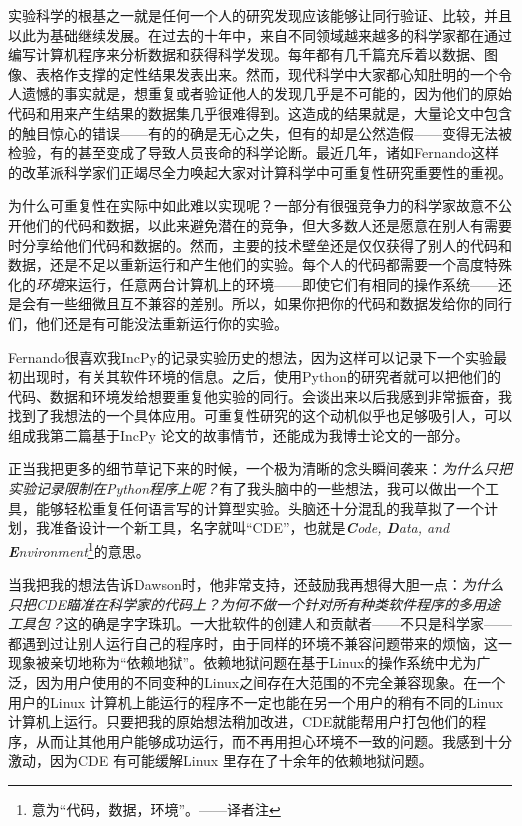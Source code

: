 \documentclass[12pt,UTF8,nofonts]{book}
\begin{document}
实验科学的根基之一就是任何一个人的研究发现应该能够让同行验证、比较，并且以此为基础继续发展。在过去的十年中，来自不同领域越来越多的科学家都在通过编写计算机程序来分析数据和获得科学发现。每年都有几千篇充斥着以数据、图像、表格作支撑的定性结果发表出来。然而，现代科学中大家都心知肚明的一个令人遗憾的事实就是，想重复或者验证他人的发现几乎是不可能的，因为他们的原始代码和用来产生结果的数据集几乎很难得到。这造成的结果就是，大量论文中包含的触目惊心的错误——有的的确是无心之失，但有的却是公然造假——变得无法被检验，有的甚至变成了导致人员丧命的科学论断。最近几年，诸如Fernando这样的改革派科学家们正竭尽全力唤起大家对计算科学中可重复性研究重要性的重视。

为什么可重复性在实际中如此难以实现呢？一部分有很强竞争力的科学家故意不公开他们的代码和数据，以此来避免潜在的竞争，但大多数人还是愿意在别人有需要时分享给他们代码和数据的。然而，主要的技术壁垒还是仅仅获得了别人的代码和数据，还是不足以重新运行和产生他们的实验。每个人的代码都需要一个高度特殊化的\emph{环境}来运行，任意两台计算机上的环境——即使它们有相同的操作系统——还是会有一些细微且互不兼容的差别。所以，如果你把你的代码和数据发给你的同行们，他们还是有可能没法重新运行你的实验。

Fernando很喜欢我IncPy的记录实验历史的想法，因为这样可以记录下一个实验最初出现时，有关其软件环境的信息。之后，使用Python的研究者就可以把他们的代码、数据和环境发给想要重复他实验的同行。会谈出来以后我感到非常振奋，我找到了我想法的一个具体应用。可重复性研究的这个动机似乎也足够吸引人，可以组成我第二篇基于IncPy 论文的故事情节，还能成为我博士论文的一部分。

正当我把更多的细节草记下来的时候，一个极为清晰的念头瞬间袭来：\emph{为什么只把实验记录限制在Python程序上呢？}有了我头脑中的一些想法，我可以做出一个工具，能够轻松重复任何语言写的计算型实验。头脑还十分混乱的我草拟了一个计划，我准备设计一个新工具，名字就叫“CDE”，也就是\emph{\textbf{C}ode, \textbf{D}ata, and \textbf{E}nvironment}\footnote{意为“代码，数据，环境”。——译者注}的意思。

\breakline

当我把我的想法告诉Dawson时，他非常支持，还鼓励我再想得大胆一点：\emph{为什么只把CDE瞄准在科学家的代码上？为何不做一个针对所有种类软件程序的多用途工具包？}这的确是字字珠玑。一大批软件的创建人和贡献者——不只是科学家——都遇到过让别人运行自己的程序时，由于同样的环境不兼容问题带来的烦恼，这一现象被亲切地称为“依赖地狱”。依赖地狱问题在基于Linux的操作系统中尤为广泛，因为用户使用的不同变种的Linux之间存在大范围的不完全兼容现象。在一个用户的Linux 计算机上能运行的程序不一定也能在另一个用户的稍有不同的Linux计算机上运行。只要把我的原始想法稍加改进，CDE就能帮用户打包他们的程序，从而让其他用户能够成功运行，而不再用担心环境不一致的问题。我感到十分激动，因为CDE 有可能缓解Linux 里存在了十余年的依赖地狱问题。
\end{document}
